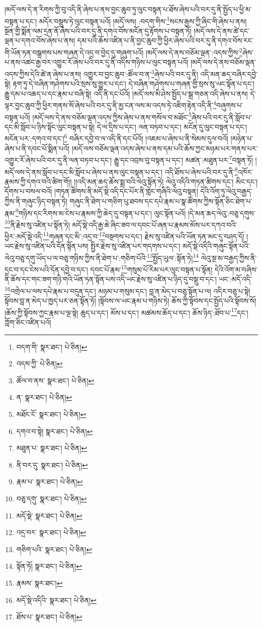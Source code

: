 །མདོ་ལས་དེ་ན་རིགས་ཀྱི་བུ་འདི་ནི་ཞེས་པ་ནས་བྱང་ཆུབ་ཏུ་ལུང་བསྟན་པ་ཐོས་ཞེས་པའི་བར་དུ་ནི་སྤྱོད་པ་ཕྱི་མ་བསྟན་པ་དང་། མདོར་བསྡུས་ཏེ་ལུང་བསྟན་པའོ། །མདོ་ལས། :བདག་གིས་\footnote{བདག་གི་  སྣར་ཐང་།  པེ་ཅིན། }སངས་རྒྱས་ཀྱི་ཞིང་གི་ཞེས་པ་ནས། སྔོན་གྱི་སྨོན་ལམ་དྲན་ནོ་ཞེས་པའི་བར་དུ་ནི་དགའ་བོས་མངོན་དུ་རྟོགས་པ་བསྟན་ཏོ། །མདོ་ལས་དེ་ནས་ཚེ་དང་ལྡན་པ་དགའ་བོས་ཞེས་པ་ནས། དམ་པའི་ཆོས་འཛིན་པ་ནི་བྱང་ཆུབ་ཀྱི་ཕྱིར་ཞེས་པའི་བར་དུ་ནི་དགའ་བོས་རང་གི་ཡོན་ཏན་བསྒྲགས་པས་གཞན་དེ་འདྲ་བ་བྱེད་དུ་གཞུག་པའོ། །མདོ་ལས་དེ་ནས་བཅོམ་ལྡན་:འདས་ཀྱིས་\footnote{འདས་ཀྱི་  པེ་ཅིན། }ཞེས་པ་ནས་འཚང་རྒྱ་བར་འགྱུར་རོ་ཞེས་པའི་བར་དུ་ནི་འདིས་གཉིས་པ་ལུང་བསྟན་པའོ། །མདོ་ལས་དེ་ནས་བཅོམ་ལྡན་འདས་ཀྱིས་དེའི་ཚེ་ན་ཞེས་པ་ནས། འགྱུར་བ་བྱང་ཆུབ་:ཚོལ་བ་ན་\footnote{ཚོལ་བ་ནས་  སྣར་ཐང་།  པེ་ཅིན། }ཞེས་པའི་བར་དུ་ནི། འདི་མན་ཆད་བཞིར་དབྱེ་སྟེ། རྟག་ཏུ་དེ་བཞིན་གཤེགས་པའི་སྲས་སུ་གྱུར་པ་དང་། དེ་བཞིན་གཤེགས་པ་གཞན་གྱི་སྲས་སུ་ཡང་སྟོན་པ་དང་། རྒྱུ་དམ་པ་འཆད་པ་དང་རྣམ་པ་བཞི་སྟེ། འདི་ནི་དང་པོའོ། །མདོ་ལས་མི་ཤེས་སྤྱོད་པ་སྒྲ་གཅན་འདི་ཞེས་པ་ནས། དེ་ལྟར་བྱང་ཆུབ་ཀྱི་ཕྱིར་གནས་སོ་ཞེས་པའི་བར་དུ་ནི་མྱ་ངན་ལས་མ་འདས་ཏེ་འཇིག་རྟེན་འདི་ནི་\footnote{ན་  སྣར་ཐང་།  པེ་ཅིན། }བཞུགས་པ་བསྟན་པའོ། །མདོ་ལས་དེ་ནས་བཅོམ་ལྡན་འདས་ཀྱིས་ཞེས་པ་ནས་གསོལ་བ་མཐོང་\footnote{མཐོང་ངོ་  སྣར་ཐང་།  པེ་ཅིན། }ཞེས་པའི་བར་དུ་ནི་སློབ་པ་དང་མི་སློབ་པ་ཉིས་སྟོང་ལུང་བསྟན་པ་སྟེ། དེ་ལ་དྲིས་པ་དང་། ལན་བཏབ་པ་དང་། མངོན་དུ་ལུང་བསྟན་པ་དང་། མངོན་པར་:དགའ་བ་དང་།\footnote{དགའ་བ་སྟེ།  སྣར་ཐང་།  པེ་ཅིན། } བཞིར་དབྱེ་བ་ལ་འདི་ནི་དང་པོའོ། །འཇམ་པ་ཞེས་པ་ནི་སེམས་དུལ་བའོ། །མཉེན་པ་ཞེས་པ་ནི་དབང་པོ་སྨིན་པའོ། །མདོ་ལས་བཅོམ་ལྡན་འདས་ཞེས་པ་ནས་དམ་པའི་ཆོས་ཀྱང་མཉམ་པར་གནས་པར་འགྱུར་རོ་ཞེས་པའི་བར་དུ་ནི་ལན་བཏབ་པ་དང་། རྒྱུ་དང་འབྲས་བུ་བསྟན་པ་དང་། མཚན་:མཐུན་པར་\footnote{མཐུན་པ་  སྣར་ཐང་།  པེ་ཅིན། }བསྟན་ཏོ། །མདོ་ལས་དེ་ནས་སློབ་པ་དང་མི་སློབ་པ་ཞེས་པ་ནས་ལུང་བསྟན་པ་དང་། འདི་ཐོས་པ་ཞེས་པའི་བར་དུ་ནི་\footnote{ནི་བར་དུ་  སྣར་ཐང་།  པེ་ཅིན། }འཁོར་རྣམས་ཀྱི་དགའ་བའི་ཚིག་གོ།། །།འདི་མན་ཆད་ཆོས་སྨྲ་བའི་ལེའུ་སྟོན་ཏེ། ལེའུ་འདིའི་གཏན་ཚིགས་དང་། མིང་དང་། དོགས་པ་བསལ་བའོ། །གཏན་ཚིགས་ནི་མདོ་སྡེ་འདི་དང་པོར་ནི་གླེང་གཞིའི་ལེའུ་བསྟན། དེའི་འོག་ཏུ་ལེའུ་བརྒྱད་ཀྱིས་ནི་གཞུང་ཉིད་བསྟན་ཏེ། གཞུང་ནི་ཐེག་པ་གཅིག་པུ་ཐབས་དང་དཔེ་རྣམ་པ་སྣ་ཚོགས་ཀྱིས་སྟོན་ཅིང་ཐེག་པ་རྣམ་\footnote{རྣམ་པ་  སྣར་ཐང་།  པེ་ཅིན། }གཉིས་དང་རིགས་མ་ངེས་པ་རྣམས་ཀྱི་ཆེད་དུ་བསྟན་པ་དང་། ལུང་སྟོན་པའོ། །དེ་མན་ཆད་ལེའུ་:བཅུ་དགུས་\footnote{བཅུ་དགུ་  སྣར་ཐང་།  པེ་ཅིན། }ནི་རྗེས་སུ་འཛིན་པ་སྟོན་ཏེ། མདོ་སྡེ་འདི་རྒྱ་ཆེ་ཞིང་ཟབ་ལ་དབང་པོ་ཞན་པ་རྣམས་མོས་པར་དཀའ་བའི་ཕྱིར་:མདོ་སྡེ་འདི་\footnote{མདོ་སྡེ་  སྣར་ཐང་།  པེ་ཅིན། }གཞན་དང་མི་:འདྲ་བ་\footnote{འདྲ་བར་  སྣར་ཐང་།  པེ་ཅིན། }བསྔགས་པ་དང་། རྗེས་སུ་འཛིན་པའི་ཡོན་ཏན་མང་དུ་བཤད་དོ། །ཡང་རྗེས་སུ་འཛིན་པའི་དོན་སྟོན་པས། སྤྱིར་རྗེས་སུ་འཛིན་པར་གདགས་པ་དང་། མདོ་སྡེ་འདིའི་གཞུང་སྟོན་པའི་ལེའུ་བཅུ་དགུ་ཡོད་པ་ལ་བཅུ་གཉིས་ཀྱིས་ནི་ཐེག་པ་:གཅིག་པོའི་\footnote{གཅིག་པའི་  སྣར་ཐང་།  པེ་ཅིན། }སྤྱོད་ཡུལ་:སྟོན་ཏེ།\footnote{སྟོན་ཏོ།  སྣར་ཐང་།  པེ་ཅིན། } ལེའུ་སྔ་མ་བརྒྱད་ཀྱིས་ནི་དྲང་བ་དང་ངེས་པའི་དོན་དབྱེ་བ་དང་། དབང་པོ་རྣམ་\footnote{རྣམས་  སྣར་ཐང་། }གསུམ་པོ་རིམ་པར་ལུང་བསྟན་པ་སྟོན། དེའི་འོག་མ་བཞིས་ནི་ཆོས་དང་གང་ཟག་གཉི་གའི་ཡོན་ཏན་སྟོན་པས་འདི་ཡང་རྗེས་སུ་འཛིན་པ་ཉིད་དུ་བསྡུ་བ་དང་། ཡང་:མདོ་འདི་\footnote{མདོ་སྡེ་འདིའི་  སྣར་ཐང་།  པེ་ཅིན། }འགྲེལ་པ་ལས་དཔེ་རྣམ་པ་བདུན་དང་། མཉམ་པ་གསུམ་དང་། བླ་ན་མེད་པ་བཅུ་སྟོན་པ་ལ། འདིར་བཅུ་པ་སྟེ། སྟོབས་བླ་ན་མེད་པ་ཁྱད་པར་ཅན་སྟོན་ཏོ། །སྟོབས་ལ་ཡང་རྣམ་པ་གཉིས་ཏེ། ཆོས་ཀྱི་སྟོབས་དང་སྤྱོད་པའི་སྟོབས་སོ། །ཆོས་ཀྱི་སྟོབས་ཀྱང་རྣམ་པ་ལྔ་སྟེ། ཆུད་པ་དང་། མོས་པ་དང་། མཚམས་ཆོད་པ་དང་། ཆོས་ཉིད་:ཐོབ་པ་\footnote{ཐོས་པ་  སྣར་ཐང་།  པེ་ཅིན། }དང་། ཀློག་ཅིང་འཛིན་པའོ། 